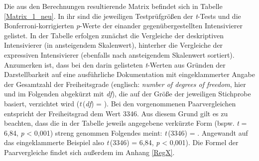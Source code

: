 Die aus den Berechnungen resultierende Matrix befindet sich in {Tabelle \ref{Matrix_1_neu}}.  In ihr sind die jeweiligen Testprüfgrößen der \textit{t}-Tests und die Bonferroni-korrigierten \textit{p}-Werte der einander gegenübergestellten Intensivierer gelistet. In der Tabelle erfolgen zunächst die Vergleiche der deskriptiven Intensivierer (in ansteigendem Skalenwert), hinterher die Vergleiche der expressiven Intensivierer (ebenfalls nach ansteigendem Skalenwert sortiert). Anzumerken ist, dass bei den darin gelisteten \textit{t}-Werten aus Gründen der Darstellbarkeit auf eine ausführliche Dokumentation mit eingeklammerter Angabe der Gesamtzahl der Freiheitsgrade (englisch: \textit{number of degrees of freedom}, hier und im Folgenden abgekürzt mit \textit{df}), die auf der Größe der jeweiligen Stichprobe basiert, verzichtet wird (\textit{t}\,(\textit{\textit{df}}) = \textelp{}). Bei den vorgenommenen Paarvergleichen entspricht der Freiheitsgrad dem Wert 3346. Aus diesem Grund gilt es zu beachten, dass die in der Tabelle jeweils angegebene verkürzte Form (bspw. \textit{t} = 6,84, {\textit{p} < 0,001}) streng genommen Folgendes meint: \textit{t}\,(3346) = \textelp{}. Angewandt auf das eingeklammerte Beispiel also {\textit{t}\,(3346) = 6,84,} {\textit{p} < 0,001}). Die Formel der Paarvergleiche findet sich außerdem im Anhang \ref{RegX}.





